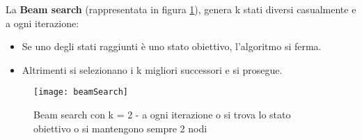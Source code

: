 La \textbf{Beam search} (rappresentata in figura \ref{fig:beamSearch}), genera
k stati diversi casualmente e a ogni iterazione:

\begin{itemize}
 \item Se uno degli stati raggiunti è uno stato obiettivo, l'algoritmo si ferma.
 \item Altrimenti si selezionano i k migliori successori e si prosegue.
\end{itemize}

\begin{figure}[H]
\centering
\texttt{[image: beamSearch]}
\caption{Beam search con k = 2 - a ogni iterazione o si trova lo stato obiettivo
o si mantengono sempre 2 nodi}
\label{fig:beamSearch}
\end{figure}
